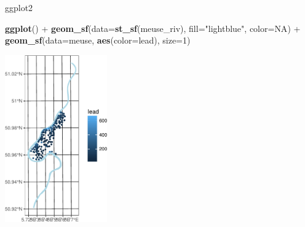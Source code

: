 \documentclass[11pt,ignorenonframetext,]{beamer}
\newenvironment{Shaded}{}{}
\newcommand{\DataTypeTok}[1]{\textcolor[rgb]{0.56,0.13,0.00}{#1}}
\newcommand{\DecValTok}[1]{\textcolor[rgb]{0.25,0.63,0.44}{#1}}
\newcommand{\KeywordTok}[1]{\textcolor[rgb]{0.00,0.44,0.13}{\textbf{#1}}}
\newcommand{\NormalTok}[1]{#1}
\newcommand{\OperatorTok}[1]{\textcolor[rgb]{0.40,0.40,0.40}{#1}}
\newcommand{\OtherTok}[1]{\textcolor[rgb]{0.00,0.44,0.13}{#1}}
\newcommand{\StringTok}[1]{\textcolor[rgb]{0.25,0.44,0.63}{#1}}
\let\oldShaded\Shaded
\let\endoldShaded\endShaded
\renewenvironment{Shaded}{\footnotesize\begin{spacing}{0.9}\oldShaded}{\endoldShaded\end{spacing}}
\let\oldverbatim\verbatim
\let\endoldverbatim\endverbatim
\newcommand{\scriptoutput}{
  \renewenvironment{Shaded}{\scriptsize\begin{spacing}{0.9}\oldShaded}{\endoldShaded\end{spacing}}
  \renewenvironment{verbatim}{\scriptsize\begin{spacing}{0.9}\oldverbatim}{\endoldverbatim\end{spacing}}
}
\begin{document}
\begin{frame}[fragile,t]{ggplot2}
\protect\hypertarget{ggplot2}{}

\scriptoutput

\begin{Shaded}
\begin{Highlighting}[]
\KeywordTok{ggplot}\NormalTok{() }\OperatorTok{+}
\StringTok{  }\KeywordTok{geom_sf}\NormalTok{(}\DataTypeTok{data=}\KeywordTok{st_sf}\NormalTok{(meuse_riv), }\DataTypeTok{fill=}\StringTok{"lightblue"}\NormalTok{, }\DataTypeTok{color=}\OtherTok{NA}\NormalTok{) }\OperatorTok{+}
\StringTok{  }\KeywordTok{geom_sf}\NormalTok{(}\DataTypeTok{data=}\NormalTok{meuse, }\KeywordTok{aes}\NormalTok{(}\DataTypeTok{color=}\NormalTok{lead), }\DataTypeTok{size=}\DecValTok{1}\NormalTok{)}
\end{Highlighting}
\end{Shaded}

\begin{center}\includegraphics[width=0.33\textwidth]{Lec16_files/figure-beamer/unnamed-chunk-13-1} \end{center}

\end{frame}
\end{document}
